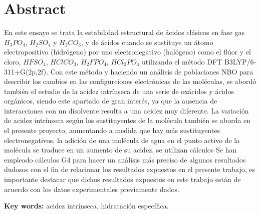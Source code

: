 
\chapter*{Abstract} 


En este ensayo se trata la estabilidad estructural de ácidos clásicos en fase gas $H_3PO_4$, $H_2SO_4$ y $H_2CO_3$, y de ácidos cuando se sustituye un átomo electropositivo (hidrógeno) por uno electronegativo (halógeno) como el flúor y el cloro, $HFSO_4$, $HClCO_3$, $H_2FPO_4$, $HCl_2PO_4$ utilizando el método DFT B3LYP/6-311+G(2p,2f).
Con este método y haciendo un análisis de poblaciones NBO para describir los cambios en las configurciones electrónicas de las moléculas, se abordó también el estudio de la acidez intrínseca de una serie de oxácidos y ácidos orgánicos, siendo este apartado de gran interés, ya que la ausencia de interacciones con un disolvente resulta a una acidez muy diferente. La variación de acidez intrínseca según los sustituyentes de la molécula también se aborda en el presente proyecto, aumentando a medida que hay más sustituyentes electronegativos, la adición de una molécula de agua en el punto activo de la molécula se traduce en un aumento de su acidez, se utilizan cálculos 
Se han empleado cálculos G4 para hacer un análisis más preciso de algunos resultados dudosos con el fin de relacionar los resultados expuestos en el presente trabajo, es importante destacar que dichos resultados expuestos en este trabajo están de acuerdo con los datos experimentales previamente dados.


\vspace{5mm}
\textbf{Key words:} acidez intrínseca, hidratación específica.
